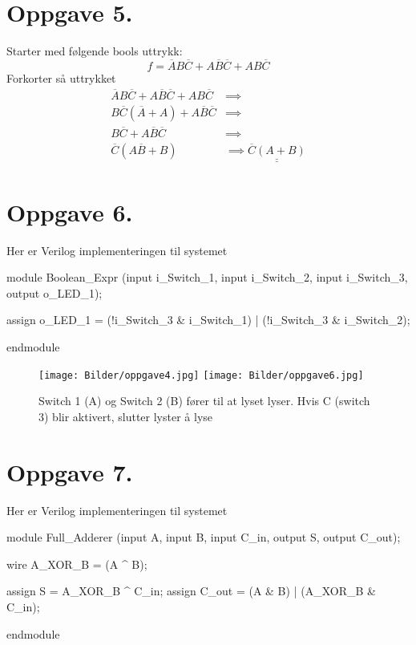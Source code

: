 \documentclass[a4paper,11pt,norsk]{article}
\begin{document}
\section*{Oppgave 5.}
Starter med følgende bools uttrykk:
\[
    f = \overline{A}B\overline{C} + A\overline{B}\overline{C} + AB\overline{C}
\]
Forkorter så uttrykket
\begin{align*}
    \overline{A}B\overline{C} + A\overline{B}\overline{C} + AB\overline{C} &\implies \\
    B\overline{C}(\overline{A} + A) + A\overline{B}\overline{C} &\implies \\ 
    B\overline{C} + A\overline{B}\overline{C} &\implies \\ 
    \overline{C}(A\overline{B} + B) &\implies 
    \underline{\underline{\overline{C}(A + B)}}
\end{align*}

\newpage
\section*{Oppgave 6.}
Her er Verilog implementeringen til systemet
\begin{verilogcode}
module Boolean_Expr
    (input i_Switch_1,
     input i_Switch_2,
     input i_Switch_3,
     output o_LED_1);

 assign o_LED_1 = (!i_Switch_3 & i_Switch_1) | (!i_Switch_3 & i_Switch_2);

endmodule    
\end{verilogcode}
\begin{figure}[H]
    \centering
    \texttt{[image: Bilder/oppgave4.jpg]}
    \texttt{[image: Bilder/oppgave6.jpg]}
    \caption{Switch 1 (A) og Switch 2 (B) fører til at lyset lyser. Hvis C (switch 3) blir aktivert, slutter lyster å lyse}
\end{figure}

\newpage
\section*{Oppgave 7.}
Her er Verilog implementeringen til systemet
\begin{verilogcode}
module Full_Adderer
    (input A,
     input B,
     input C_in,
     output S,
     output C_out);

 wire A_XOR_B = (A ^ B);

 assign S = A_XOR_B ^ C_in;
 assign C_out = (A & B) | (A_XOR_B & C_in);

endmodule
\end{verilogcode}
\end{document}
